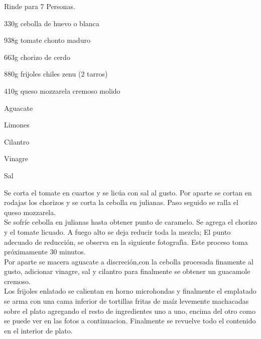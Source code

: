 Rinde para 7 Personas.\\
\begin{ingredientes}
\item 330g cebolla de huevo o blanca
\item 938g tomate chonto maduro
\item 663g chorizo de cerdo
\item 880g frijoles chiles zenu (2 tarros)
\item 410g queso mozzarela cremoso molido
\item Aguacate
\item Limones
\item Cilantro
\item Vinagre
\item Sal
\end{ingredientes}
\preparacion
Se corta el tomate en cuartos y se licúa con sal al gusto. Por aparte se cortan en rodajas los chorizos y se corta la cebolla en julianas. Paso seguido se ralla el queso mozzarela.\\

Se sofríe cebolla en julianas hasta obtener punto de caramelo. Se agrega el chorizo y el tomate licuado. A fuego alto se deja reducir toda la mezcla; El punto adecuado de reducción, se observa en la siguiente fotografìa. Este proceso toma próximamente 30 minutos.\\

Por aparte se macera aguacate a discreción,con la cebolla procesada finamente al gusto, adicionar vinagre, sal y cilantro para finalmente se obtener un guacamole cremoso.\\

Los frijoles enlatado se calientan en horno microhondas y finalmente el emplatado se arma con una cama inferior de tortillas fritas de maíz levemente machacadas sobre el plato agregando el resto de ingredientes uno a uno, encima del otro como se puede ver en las fotos a continuacion. Finalmente se revuelve todo el contenido en el interior de plato.